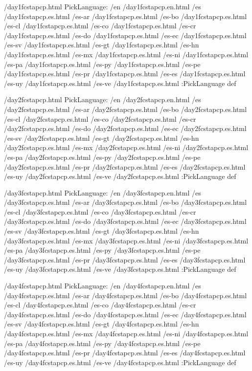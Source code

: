 \begin{ingrid}
/day1fcstapcp.html {
PickLanguage:
/en /day1fcstapcp.en.html
/es /day1fcstapcp.es.html
/es-ar /day1fcstapcp.es.html
/es-bo /day1fcstapcp.es.html
/es-cl /day1fcstapcp.es.html
/es-co /day1fcstapcp.es.html
/es-cr /day1fcstapcp.es.html
/es-do /day1fcstapcp.es.html
/es-ec /day1fcstapcp.es.html
/es-sv /day1fcstapcp.es.html
/es-gt /day1fcstapcp.es.html
/es-hn /day1fcstapcp.es.html
/es-mx /day1fcstapcp.es.html
/es-ni /day1fcstapcp.es.html
/es-pa /day1fcstapcp.es.html
/es-py /day1fcstapcp.es.html
/es-pe /day1fcstapcp.es.html
/es-pr /day1fcstapcp.es.html
/es-es /day1fcstapcp.es.html
/es-uy /day1fcstapcp.es.html
/es-ve /day1fcstapcp.es.html
:PickLanguage
} def

/day2fcstapcp.html {
PickLanguage:
/en /day2fcstapcp.en.html
/es /day2fcstapcp.es.html
/es-ar /day2fcstapcp.es.html
/es-bo /day2fcstapcp.es.html
/es-cl /day2fcstapcp.es.html
/es-co /day2fcstapcp.es.html
/es-cr /day2fcstapcp.es.html
/es-do /day2fcstapcp.es.html
/es-ec /day2fcstapcp.es.html
/es-sv /day2fcstapcp.es.html
/es-gt /day2fcstapcp.es.html
/es-hn /day2fcstapcp.es.html
/es-mx /day2fcstapcp.es.html
/es-ni /day2fcstapcp.es.html
/es-pa /day2fcstapcp.es.html
/es-py /day2fcstapcp.es.html
/es-pe /day2fcstapcp.es.html
/es-pr /day2fcstapcp.es.html
/es-es /day2fcstapcp.es.html
/es-uy /day2fcstapcp.es.html
/es-ve /day2fcstapcp.es.html
:PickLanguage
} def

/day3fcstapcp.html {
PickLanguage:
/en /day3fcstapcp.en.html
/es /day3fcstapcp.es.html
/es-ar /day3fcstapcp.es.html
/es-bo /day3fcstapcp.es.html
/es-cl /day3fcstapcp.es.html
/es-co /day3fcstapcp.es.html
/es-cr /day3fcstapcp.es.html
/es-do /day3fcstapcp.es.html
/es-ec /day3fcstapcp.es.html
/es-sv /day3fcstapcp.es.html
/es-gt /day3fcstapcp.es.html
/es-hn /day3fcstapcp.es.html
/es-mx /day3fcstapcp.es.html
/es-ni /day3fcstapcp.es.html
/es-pa /day3fcstapcp.es.html
/es-py /day3fcstapcp.es.html
/es-pe /day3fcstapcp.es.html
/es-pr /day3fcstapcp.es.html
/es-es /day3fcstapcp.es.html
/es-uy /day3fcstapcp.es.html
/es-ve /day3fcstapcp.es.html
:PickLanguage
} def

/day4fcstapcp.html {
PickLanguage:
/en /day4fcstapcp.en.html
/es /day4fcstapcp.es.html
/es-ar /day4fcstapcp.es.html
/es-bo /day4fcstapcp.es.html
/es-cl /day4fcstapcp.es.html
/es-co /day4fcstapcp.es.html
/es-cr /day4fcstapcp.es.html
/es-do /day4fcstapcp.es.html
/es-ec /day4fcstapcp.es.html
/es-sv /day4fcstapcp.es.html
/es-gt /day4fcstapcp.es.html
/es-hn /day4fcstapcp.es.html
/es-mx /day4fcstapcp.es.html
/es-ni /day4fcstapcp.es.html
/es-pa /day4fcstapcp.es.html
/es-py /day4fcstapcp.es.html
/es-pe /day4fcstapcp.es.html
/es-pr /day4fcstapcp.es.html
/es-es /day4fcstapcp.es.html
/es-uy /day4fcstapcp.es.html
/es-ve /day4fcstapcp.es.html
:PickLanguage
} def


\end{ingrid}
